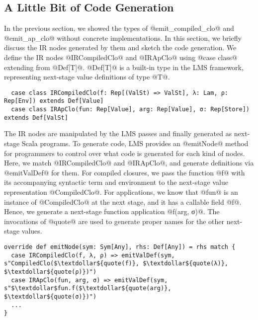 \subsection{A Little Bit of Code Generation}

In the previous section, we showed the types of @emit_compiled_clo@ and
@emit_ap_clo@ without concrete implementations. In this section, we briefly
discuss the IR nodes generated by them and sketch the code generation.
We define the IR nodes @IRCompiledClo@ and @IRApClo@ using @case class@
extending from @Def[T]@. @Def[T]@ is a built-in type in the LMS framework,
representing next-stage value definitions of type @T@.
\begin{lstlisting}
  case class IRCompiledClo(f: Rep[(ValSt) => ValSt], λ: Lam, ρ: Rep[Env]) extends Def[Value]
  case class IRApClo(fun: Rep[Value], arg: Rep[Value], σ: Rep[Store]) extends Def[ValSt]
\end{lstlisting}

The IR nodes are manipulated by the LMS passes and finally generated as
next-stage Scala programs. To generate code, LMS provides an @emitNode@ method for
programmers to control over what code is generated for each kind of nodes. Here,
we match @IRCompiledClo@ and @IRApClo@, and generate definitions via
@emitValDef@ for them.  For compiled closures, we pass the function @f@ with its
accompanying syntactic term and environment to the next-stage value
representation @CompiledClo@. For applications, we know that @fun@ is
an instance of @CompiledClo@ at the next stage, and it has a callable field
@f@. Hence, we generate a next-stage function application @f(arg, σ)@.  The
invocations of @quote@ are used to generate proper names for the other
next-stage values.
\begin{lstlisting}
override def emitNode(sym: Sym[Any], rhs: Def[Any]) = rhs match {
  case IRCompiledClo(f, λ, ρ) => emitValDef(sym, s"CompiledClo($\textdollar${quote(f)}, $\textdollar${quote(λ)}, $\textdollar${quote(ρ)})")
  case IRApClo(fun, arg, σ) => emitValDef(sym, s"$\textdollar$fun.f($\textdollar${quote(arg)}, $\textdollar${quote(σ)})")
  ...
}
\end{lstlisting}
